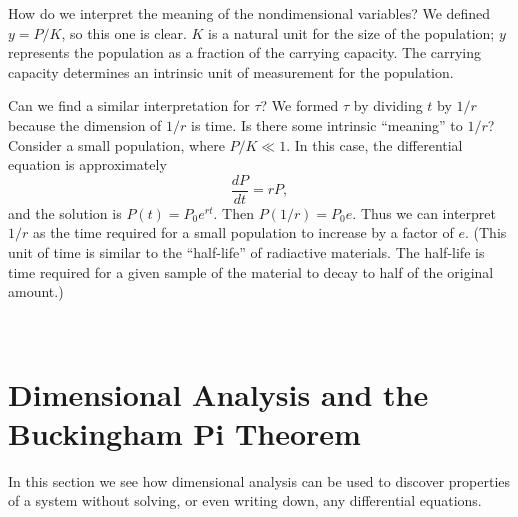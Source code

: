 \documentclass[reqno]{immbook}
\numberwithin{equation}{chapter}
\numberwithin{question}{section}
\numberwithin{theorem}{chapter}
\numberwithin{figure}{chapter}
\theoremstyle{definition}
\begin{document}
How do we interpret the meaning of the nondimensional
variables?  We defined $y=P/K$, so this one is clear.
$K$ is a natural unit for the size of the population;
$y$ represents the population as a fraction of the
carrying capacity.
The carrying capacity determines an intrinsic
unit of measurement for the population.

Can we find a similar interpretation for $\tau$? We
formed $\tau$ by dividing $t$ by $1/r$ because
the dimension of $1/r$ is time. Is there some
intrinsic ``meaning'' to $1/r$?  Consider
a small population, where $P/K \ll 1$.  In this
case, the differential equation is approximately
\[
   \frac{dP}{dt} = rP,
\]
and the solution is $P(t) = P_0 e^{rt}$.
Then $P(1/r) = P_0 e$.
Thus we can interpret $1/r$ as the time required
for a small population to increase by
a factor of $e$.  (This unit of time is similar
to the ``half-life'' of radiactive materials.
The half-life is time required for a given sample
of the material to decay to half of the original
amount.)


\newpage

~

\newpage

\section{Dimensional Analysis and the Buckingham Pi Theorem}

In this section we see how dimensional analysis can be
used to discover properties of a system
without solving, or even  writing down,
any differential equations.
\end{document}
